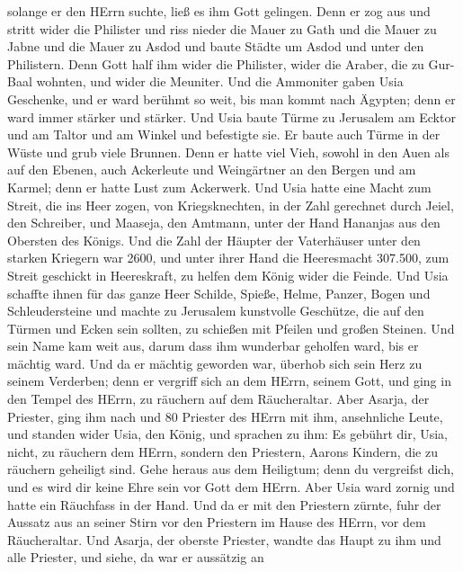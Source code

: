 solange er den HErrn suchte, ließ es ihm Gott gelingen. 
Denn er zog aus und stritt wider die Philister und riss nieder die Mauer
zu Gath und die Mauer zu Jabne und die Mauer zu Asdod und baute Städte
um Asdod und unter den Philistern.  Denn Gott half ihm wider
die Philister, wider die Araber, die zu Gur-Baal wohnten, und wider die
Meuniter.  Und die Ammoniter gaben Usia Geschenke, und er
ward berühmt so weit, bis man kommt nach Ägypten; denn er ward immer
stärker und stärker.  Und Usia baute Türme zu Jerusalem am
Ecktor und am Taltor und am Winkel und befestigte sie.  Er
baute auch Türme in der Wüste und grub viele Brunnen. Denn er hatte viel
Vieh, sowohl in den Auen als auf den Ebenen, auch Ackerleute und
Weingärtner an den Bergen und am Karmel; denn er hatte Lust zum
Ackerwerk.  Und Usia hatte eine Macht zum Streit, die ins
Heer zogen, von Kriegsknechten, in der Zahl gerechnet durch Jeiel, den
Schreiber, und Maaseja, den Amtmann, unter der Hand Hananjas aus den
Obersten des Königs.  Und die Zahl der Häupter der
Vaterhäuser unter den starken Kriegern war 2600,  und unter
ihrer Hand die Heeresmacht 307.500, zum Streit geschickt in Heereskraft,
zu helfen dem König wider die Feinde.  Und Usia schaffte
ihnen für das ganze Heer Schilde, Spieße, Helme, Panzer, Bogen und
Schleudersteine  und machte zu Jerusalem kunstvolle
Geschütze, die auf den Türmen und Ecken sein sollten, zu schießen mit
Pfeilen und großen Steinen. Und sein Name kam weit aus, darum dass ihm
wunderbar geholfen ward, bis er mächtig ward.  Und da er
mächtig geworden war, überhob sich sein Herz zu seinem Verderben; denn
er vergriff sich an dem HErrn, seinem Gott, und ging in den Tempel des
HErrn, zu räuchern auf dem Räucheraltar.  Aber Asarja, der
Priester, ging ihm nach und 80 Priester des HErrn mit ihm, ansehnliche
Leute,  und standen wider Usia, den König, und sprachen zu
ihm: Es gebührt dir, Usia, nicht, zu räuchern dem HErrn, sondern den
Priestern, Aarons Kindern, die zu räuchern geheiligt sind. Gehe heraus
aus dem Heiligtum; denn du vergreifst dich, und es wird dir keine Ehre
sein vor Gott dem HErrn.  Aber Usia ward zornig und hatte
ein Räuchfass in der Hand. Und da er mit den Priestern zürnte, fuhr der
Aussatz aus an seiner Stirn vor den Priestern im Hause des HErrn, vor
dem Räucheraltar.  Und Asarja, der oberste Priester, wandte
das Haupt zu ihm und alle Priester, und siehe, da war er aussätzig an
